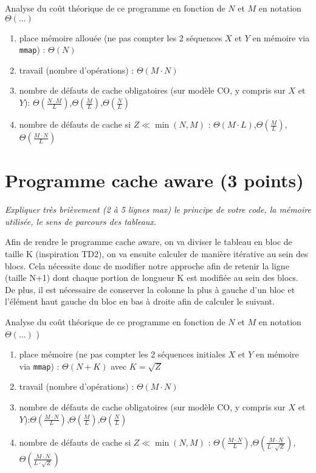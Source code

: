 \documentclass[10pt,a4paper]{article}
\begin{document}
Analyse du coût théorique de ce  programme en fonction de $N$ et $M$  en notation $\Theta(...)$ 
\begin{enumerate}
  \item place mémoire allouée (ne pas compter les 2 séquences $X$ et $Y$ en mémoire via {\tt mmap}) :   $\Theta(N)$
  \item travail (nombre d'opérations) : $\Theta(M\cdot N)$
  \item nombre de défauts de cache obligatoires (sur modèle CO, y compris sur $X$ et $Y$): $\Theta \left( \displaystyle{\frac{N\cdot M}{L}}\right)$,$\Theta \left( \displaystyle{\frac{M}{L}}\right)$,$\Theta \left( \displaystyle{\frac{N}{L}}\right)$
  \item nombre de défauts de cache si $Z \ll \min(N,M)$ : $\Theta \left(M\cdot{L}\right)$,$\Theta \left( \displaystyle{\frac{M}{L}}\right)$,$\Theta \left( \displaystyle{\frac{M\cdot N}{L}}\right)$
\end{enumerate}

\section{Programme cache aware  (3 points)}
{\em Expliquer très brièvement (2 à 5 lignes max) le principe de votre code, la mémoire utilisée, le sens de parcours des tableaux.}
\vspace*{0.1cm}

Afin de rendre le programme cache aware, on va diviser le tableau en bloc de taille K (inspiration TD2), on va ensuite calculer de manière itérative au sein des blocs. Cela nécessite donc de modifier notre approche afin de retenir la ligne (taille N+1) dont chaque portion de longueur K est modifiée au sein des blocs. De plus, il est nécessaire de conserver la colonne la plus à gauche d'un bloc et l'élément haut gauche du bloc en bas à droite afin de calculer le suivant.
\vspace{1cm}

Analyse du coût théorique de ce  programme en fonction de $N$ et $M$  en notation $\Theta(...)$ )
\begin{enumerate}
  \item place mémoire (ne pas compter les 2 séquences initiales $X$ et $Y$ en mémoire via {\tt mmap}) : $\Theta(N + K)$ avec $K = \sqrt{Z}$
  \item travail (nombre d'opérations) : $\Theta(M\cdot N)$
  \item nombre de défauts de cache obligatoires (sur modèle CO, y compris sur $X$ et $Y$):$\Theta \left( \displaystyle{\frac{M\cdot N}{L}}\right)$,$\Theta \left( \displaystyle{\frac{M}{L}}\right)$,$\Theta \left( \displaystyle{\frac{N}{L}}\right)$
  \item nombre de défauts de cache si $Z \ll \min(N,M)$ : $\Theta \left( \displaystyle{\frac{M\cdot N}{L}}\right)$,$\Theta \left( \displaystyle{\frac{M\cdot N}{L\cdot \sqrt{Z}}}\right)$,$\Theta \left( \displaystyle{\frac{M\cdot N}{L\cdot \sqrt{Z}}}\right)$
\end{enumerate}
\end{document}
